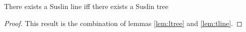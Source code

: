 \begin{thm}
	There exists a Suslin line iff there exists a Suslin tree
\end{thm}
\begin{proof}
	This result is the combination of lemmas \ref{lem:ltree} and \ref{lem:tline}.
\end{proof}
